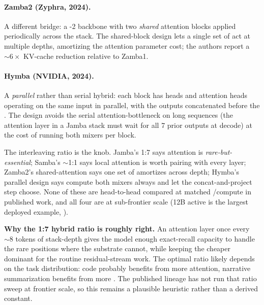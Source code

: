\paragraph{Zamba2 (Zyphra, 2024).}
A different bridge: a -2 backbone with two \emph{shared}
attention blocks applied periodically across the stack. The shared-block
design lets a single set of  act at multiple depths,
amortizing the attention parameter cost; the authors report a
$\sim 6\times$ KV-cache reduction relative to Zamba1.

\paragraph{Hymba (NVIDIA, 2024).}
A \emph{parallel} rather than serial hybrid: each block has  heads
and attention heads operating on the same input in parallel, with the
outputs concatenated before the . The design avoids the serial
attention-bottleneck on long sequences (the attention layer in a Jamba
stack must wait for all 7 prior  outputs at decode) at the cost of
running both mixers per block.

The interleaving ratio is the  knob. Jamba's 1:7 says attention is
\emph{rare-but-essential}; Samba's $\sim$1:1 says local attention is
worth pairing with every  layer; Zamba2's shared-attention says one
set of  amortizes across depth; Hymba's parallel design
says compute both mixers always and let the concat-and-project step
choose. None of these are head-to-head compared at matched
/compute in published work, and all four are at sub-frontier
scale (12B active is the largest deployed example,
\citet{lieber2024-jamba}).

\begin{speculation}
\textbf{Why the 1:7 hybrid ratio is roughly right.} An attention layer
once every $\sim 8$ tokens of stack-depth gives the model enough
exact-recall capacity to handle the rare positions where the 
substrate cannot, while keeping the cheaper  dominant for the
routine residual-stream work. The optimal ratio likely depends on the
task distribution: code probably benefits from more attention,
narrative summarization benefits from more . The published lineage
has not run that ratio sweep at frontier scale, so this remains a
plausible heuristic rather than a derived constant.
\end{speculation}

